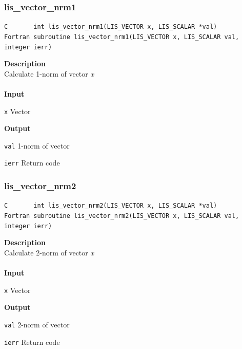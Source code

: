 \documentclass[a4paper]{article}
\newcommand{\namelistlabel}[1]{\mbox{#1}\hfill}
\newenvironment{namelist}[1]{%
 \begin{list}{}
  {\let\makelabel\namelistlabel
  \settowidth{\labelwidth}{#1}
  \setlength{\leftmargin}{1.1\labelwidth}}
}{%
\end{list}}
\begin{document}
  \subsubsection{lis\_vector\_nrm1}
\begin{screen}
\verb|C       int lis_vector_nrm1(LIS_VECTOR x, LIS_SCALAR *val)|\\
\verb|Fortran subroutine lis_vector_nrm1(LIS_VECTOR x, LIS_SCALAR val, integer ierr)|
\end{screen}
{\bf Description}\\
\indent
Calculate 1-norm of vector $x$ 
\\ \\
\noindent
{\bf Input}
\begin{namelist}{XXXXXXXXXXXXXXXXXXXX}
\item[\tt x] Vector
\end{namelist}
{\bf Output}
\begin{namelist}{XXXXXXXXXXXXXXXXXXXX}
\item[\tt val] 1-norm of vector
\item[\tt ierr] Return code
\end{namelist}
  \subsubsection{lis\_vector\_nrm2}
\begin{screen}
\verb|C       int lis_vector_nrm2(LIS_VECTOR x, LIS_SCALAR *val)|\\
\verb|Fortran subroutine lis_vector_nrm2(LIS_VECTOR x, LIS_SCALAR val, integer ierr)|
\end{screen}
{\bf Description}\\
\indent
Calculate 2-norm of vector $x$
\\ \\
\noindent
{\bf Input}
\begin{namelist}{XXXXXXXXXXXXXXXXXXXX}
\item[\tt x] Vector
\end{namelist}
{\bf Output}
\begin{namelist}{XXXXXXXXXXXXXXXXXXXX}
\item[\tt val] 2-norm of vector
\item[\tt ierr] Return code
\end{namelist}
\newpage
\end{document}
